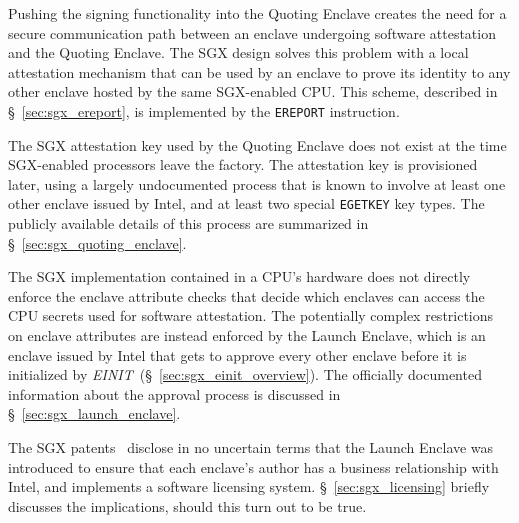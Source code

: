 Pushing the signing functionality into the Quoting Enclave creates the need for
a secure communication path between an enclave undergoing software attestation
and the Quoting Enclave. The SGX design solves this problem with a local
attestation mechanism that can be used by an enclave to prove its identity to
any other enclave hosted by the same SGX-enabled CPU. This scheme, described in
\S~\ref{sec:sgx_ereport}, is implemented by the \texttt{EREPORT} instruction.


The SGX attestation key used by the Quoting Enclave does not exist at the time
SGX-enabled processors leave the factory. The attestation key is provisioned
later, using a largely undocumented process that is known to involve at least
one other enclave issued by Intel, and at least two special \texttt{EGETKEY}
key types. The publicly available details of this process are summarized in
\S~\ref{sec:sgx_quoting_enclave}.

The SGX implementation contained in a CPU's hardware does not directly enforce
the enclave attribute checks that decide which enclaves can access the CPU
secrets used for software attestation. The potentially complex restrictions on
enclave attributes are instead enforced by the Launch Enclave, which is an
enclave issued by Intel that gets to approve every other enclave before it is
initialized by \textit{EINIT}~(\S~\ref{sec:sgx_einit_overview}). The officially
documented information about the approval process is discussed in
\S~\ref{sec:sgx_launch_enclave}.


The SGX patents~\cite{intel2013patent1, intel2013patent2} disclose in no
uncertain terms that the Launch Enclave was introduced to ensure that each
enclave's author has a business relationship with Intel, and implements a
software licensing system. \S~\ref{sec:sgx_licensing} briefly discusses the
implications, should this turn out to be true.


